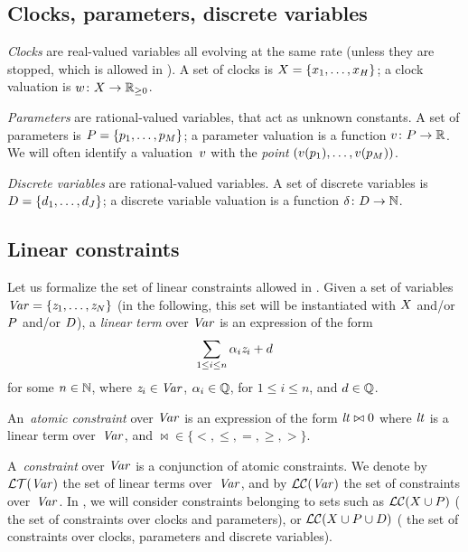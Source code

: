 \subsection{Clocks, parameters, discrete variables}

\emph{Clocks} are real-valued variables all evolving at the same rate (unless they are stopped, which is allowed in \imitator{}).
A set of clocks is $X = \{ x_1, \dots, x_H \}$;
a clock valuation is
$w \colon X \rightarrow {\mathbb R}_{\geq 0}$.

\emph{Parameters} are rational-valued variables, that act as unknown constants.
A set of parameters is $P = \{ p_1, \dots, p_M \} $;
a parameter valuation is a function $v\colon P \rightarrow {\mathbb R}$.
We will often identify a valuation~$v$ with the \emph{point} $(v(p_1), \dots, v(p_{M}))$.

\emph{Discrete variables} are rational-valued variables.
A set of discrete variables is $D = \{ d_1, \dots, d_J \} $;
a discrete variable valuation is a function $\delta \colon D \rightarrow {\mathbb N}$.


\subsection{Linear constraints}\label{ss:constraints}

Let us formalize the set of linear constraints allowed in \imitator{}.
Given a set of variables~$\mathit{Var} = \{ \mathit{z}_1, \dots, \mathit{z}_N \}$ (in the following, this set will be instantiated with $X$ and/or $P$ and/or $D$), a \emph{linear term} over $\mathit{Var}$ is an expression of the form
$$
	\sum_{1 \leq i \leq n} \alpha_i \mathit{z}_i + d
$$
for some $n \in {\mathbb N}$,
where
$\mathit{z}_{i} \in \mathit{Var}$,
$\alpha_{i} \in {\mathbb Q}$, for $1 \leq i \leq n$,
and
$d \in {\mathbb Q}$.

An~\emph{atomic constraint} over $\mathit{Var}$ is an expression of the form
$
	\mathit{lt} \bowtie 0
$
where
$\mathit{lt}$ is a linear term over~$\mathit{Var}$,
and
${\bowtie} \in \{ <, \leq, =, \geq, > \}$.

A~\emph{constraint} over $\mathit{Var}$ is a conjunction of atomic constraints.
We denote by $\mathcal{LT}(\mathit{Var})$ the set of linear terms over~$\mathit{Var}$, and by $\mathcal{LC}(\mathit{Var})$ the set of constraints over~$\mathit{Var}$.
In \imitator{}, we will consider constraints belonging to sets such as $\mathcal{LC}(X \cup P)$ (\ie{} the set of constraints over clocks and parameters), or $\mathcal{LC}(X \cup P \cup D)$ (\ie{} the set of constraints over clocks, parameters and discrete variables).



